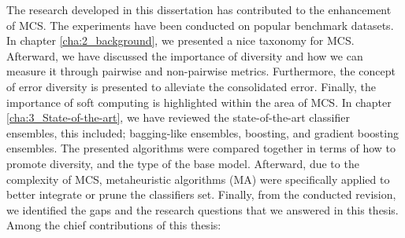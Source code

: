 The research developed in this dissertation has contributed to the enhancement of MCS. The experiments have been conducted on popular benchmark datasets. In chapter \ref{cha:2_background}, we presented a nice taxonomy for MCS. Afterward, we have discussed the importance of diversity and how we can measure it through pairwise and non-pairwise metrics. Furthermore, the concept of error diversity is presented to alleviate the consolidated error. Finally, the importance of soft computing is highlighted within the area of MCS. In chapter \ref{cha:3_State-of-the-art}, we have reviewed the state-of-the-art classifier ensembles, this included; bagging-like ensembles, boosting, and gradient boosting ensembles. The presented algorithms were compared together in terms of how to promote diversity, and the type of the base model. Afterward, due to the complexity of MCS, metaheuristic algorithms (MA) were specifically applied to better integrate or prune the classifiers set. Finally, from the conducted revision, we identified the gaps and the research questions that we answered in this thesis. Among the chief contributions of this thesis:

